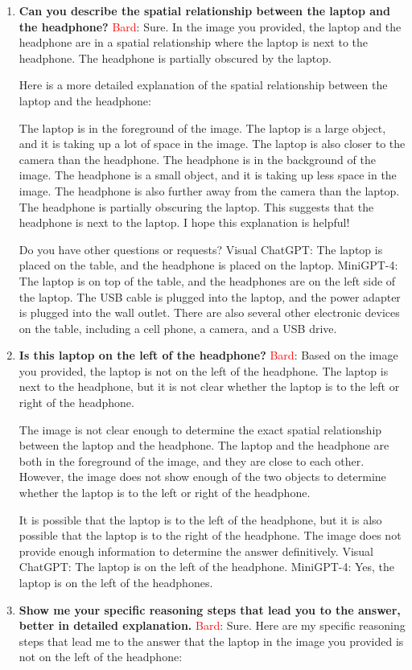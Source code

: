 \begin{enumerate}
    \item \textbf{Can you describe the spatial relationship between the laptop and the headphone?}
    \subitem \textcolor{Red}{Bard}: 
    Sure. In the image you provided, the laptop and the headphone are in a spatial relationship where the laptop is next to the headphone. The headphone is partially obscured by the laptop.

    Here is a more detailed explanation of the spatial relationship between the laptop and the headphone:

    The laptop is in the foreground of the image. The laptop is a large object, and it is taking up a lot of space in the image. The laptop is also closer to the camera than the headphone.
    The headphone is in the background of the image. The headphone is a small object, and it is taking up less space in the image. The headphone is also further away from the camera than the laptop.
    The headphone is partially obscuring the laptop. This suggests that the headphone is next to the laptop.
    I hope this explanation is helpful!

    Do you have other questions or requests?
    \subitem Visual ChatGPT: The laptop is placed on the table, and the headphone is placed on the laptop.
    \subitem MiniGPT-4: The laptop is on top of the table, and the headphones are on the left side of the laptop. The USB cable is plugged into the laptop, and the power adapter is plugged into the wall outlet. There are also several other electronic devices on the table, including a cell phone, a camera, and a USB drive.
    \item \textbf{Is this laptop on the left of the headphone?}
    \subitem \textcolor{Red}{Bard}: 
    Based on the image you provided, the laptop is not on the left of the headphone. The laptop is next to the headphone, but it is not clear whether the laptop is to the left or right of the headphone.
    
    The image is not clear enough to determine the exact spatial relationship between the laptop and the headphone. The laptop and the headphone are both in the foreground of the image, and they are close to each other. However, the image does not show enough of the two objects to determine whether the laptop is to the left or right of the headphone.
    
    It is possible that the laptop is to the left of the headphone, but it is also possible that the laptop is to the right of the headphone. The image does not provide enough information to determine the answer definitively.
    \subitem Visual ChatGPT: The laptop is on the left of the headphone.
    \subitem MiniGPT-4: Yes, the laptop is on the left of the headphones.
    \item \textbf{Show me your specific reasoning steps that lead you to the answer, better in detailed explanation.}
    \subitem \textcolor{Red}{Bard}: 
    Sure. Here are my specific reasoning steps that lead me to the answer that the laptop in the image you provided is not on the left of the headphone:
    

\end{enumerate}
